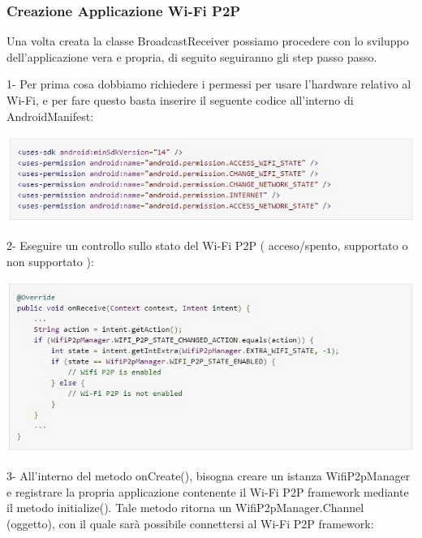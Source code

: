 \subsubsection{Creazione Applicazione Wi-Fi P2P}

Una volta creata la classe BroadcastReceiver possiamo procedere con lo sviluppo dell'applicazione vera e propria, di seguito seguiranno gli step passo passo.

1- Per prima cosa dobbiamo richiedere i permessi per usare l'hardware relativo al Wi-Fi, e per fare questo basta inserire il seguente codice all'interno di AndroidManifest:


\begin{center}
\includegraphics[width=1\textwidth]{imgs/manifest.jpg}
\label{manifest_img}%
\end{center}

2- Eseguire un controllo sullo stato del Wi-Fi P2P ( acceso/spento, supportato o non supportato ): 
   
\begin{center}
\includegraphics[width=1\textwidth]{imgs/check_wifi_avaiable.jpg}
\label{check_wifi_avaiable_img}%
\end{center}

3- All'interno del metodo onCreate(), bisogna creare un istanza WifiP2pManager e registrare la propria applicazione contenente il Wi-Fi P2P framework mediante il metodo initialize().
Tale metodo ritorna un WifiP2pManager.Channel (oggetto), con il quale sarà possibile connettersi al Wi-Fi P2P framework:

